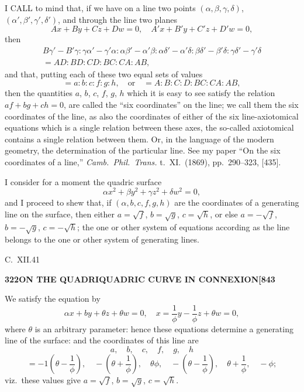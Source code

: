 \documentclass[12pt,a4paper]{article}
\theoremstyle{definition}
\begin{document}
\noindent I CALL to mind that, if we have on a line two points $(\alpha, \beta, \gamma, \delta)$, $(\alpha', \beta', \gamma', \delta')$, and through the line two planes
\[
Ax + By + Cz + Dw = 0, \quad A'x + B'y + C'z + D'w = 0,
\]
then
\begin{align*}
B\gamma' - B'\gamma : \gamma\alpha' - \gamma'\alpha : \alpha\beta' - \alpha'\beta : \alpha\delta' - \alpha'\delta : \beta\delta' - \beta'\delta : \gamma\delta' - \gamma'\delta \\
= AD : BD : CD : BC : CA : AB,
\end{align*}
and that, putting each of these two equal sets of values
\[
= a : b : c : f : g : h, \quad \text{or} \quad = A : B : C : D : BC : CA : AB,
\]
then the quantities $a$, $b$, $c$, $f$, $g$, $h$ which it is easy to see satisfy the relation $af + bg + ch = 0$, are called the ``six coordinates'' on the line; we call them the six coordinates of the line, as also the coordinates of either of the six line-axiotomical equations which is a single relation between these axes, the so-called axiotomical contains a single relation between them. Or, in the language of the modern geometry, the determination of the particular line. See my paper ``On the six coordinates of a line,'' \textit{Camb.\ Phil.\ Trans.} t.\ XI.\ (1869), pp.\ 290--323, [435].

I consider for a moment the quadric surface
\[
\alpha x^2 + \beta y^2 + \gamma z^2 + \delta w^2 = 0,
\]
and I proceed to shew that, if $(\alpha, b, c, f, g, h)$ are the coordinates of a generating line on the surface, then either $a = \sqrt{f}$, $b = \sqrt{g}$, $c = \sqrt{h}$, or else $a = -\sqrt{f}$, $b = -\sqrt{g}$, $c = -\sqrt{h}$; the one or other system of equations according as the line belongs to the one or other system of generating lines.

\hfill C.\ XII.\hfill 41

\newpage
\setcounter{page}{322}

\noindent\textbf{322}\hfill\textbf{ON THE QUADRIQUADRIC CURVE IN CONNEXION}\hfill\textbf{[843}

\bigskip

\noindent We satisfy the equation by
\[
\alpha x + by + \theta z + \theta w = 0, \quad x = \frac{1}{\phi}y - \frac{1}{\phi}z + \theta w = 0,
\]
where $\theta$ is an arbitrary parameter: hence these equations determine a generating line of the surface: and the coordinates of this line are
\[
a, \quad b, \quad c, \quad f, \quad g, \quad h
\]
\[
= -1\left(\theta - \frac{1}{\phi}\right), \quad -\left(\theta + \frac{1}{\phi}\right), \quad \theta\phi, \quad -\left(\theta - \frac{1}{\phi}\right), \quad \theta + \frac{1}{\phi}, \quad -\phi;
\]
viz.\ these values give $a = \sqrt{f}$, $b = \sqrt{g}$, $c = \sqrt{h}$.
\end{document}
